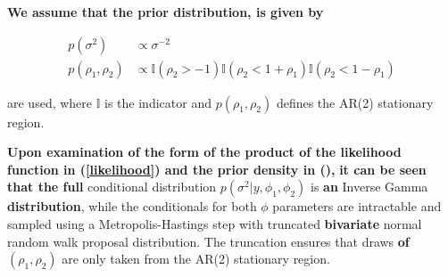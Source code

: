 \documentclass[12pt,a4paper]{article}%
\numberwithin{equation}{section}
\begin{document}
{\bf We assume that the prior distribution, is given by }

\begin{align}
p(\sigma^2) &\propto \sigma^{-2} \nonumber \\
p(\rho_1, \rho_2) &\propto \mathbb{I}(\rho_2 > -1)\mathbb{I}(\rho_2 < 1 + \rho_1) \mathbb{I}(\rho_2 < 1 - \rho_1) \nonumber
\end{align}

are used, where $\mathbb{I}$ is the indicator and $p(\rho_1, \rho_2)$ defines the AR(2) stationary region.


{\bf Upon examination of the form of the product of the likelihood function in (\ref{likelihood}) and the prior density in (),}
{\bf it can be seen that the full} conditional distribution $p(\sigma^2 | y, \phi_1, \phi_2)$ is {\bf an} Inverse Gamma {\bf distribution},
 while the conditionals for both $\phi$ parameters are intractable and sampled using a Metropolis-Hastings step 
with truncated {\bf bivariate} %
normal random walk {proposal distribution}. The truncation ensures that draws {\bf of $(\rho_1,\rho_2)$} %
are only taken from the AR(2) stationary region.

\end{document}
